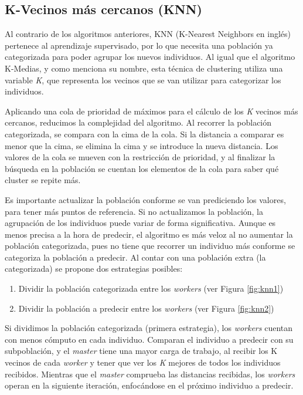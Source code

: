 		
		
		
	\subsection{K-Vecinos más cercanos (KNN)}
	\label{cap:3_2_3}
		Al contrario de los algoritmos anteriores, KNN (K-Nearest Neighbors en inglés) pertenece al aprendizaje supervisado, por lo que necesita una población ya categorizada para poder agrupar los nuevos individuos. Al igual que el algoritmo K-Medias, y como menciona su nombre, esta técnica de clustering utiliza una variable \textit{K}, que representa los vecinos que se van utilizar para categorizar los individuos.
		
		Aplicando una cola de prioridad de máximos para el cálculo de los \textit{K} vecinos más cercanos, reducimos la complejidad del algoritmo. Al recorrer la población categorizada, se compara con la cima de la cola. Si la distancia a comparar es menor que la cima, se elimina la cima y se introduce la nueva distancia. Los valores de la cola se mueven con la restricción de prioridad, y al finalizar la búsqueda en la población se cuentan los elementos de la cola para saber qué cluster se repite más.
		
		Es importante actualizar la población conforme se van prediciendo los valores, para tener más puntos de referencia. Si no actualizamos la población, la agrupación de los individuos puede variar de forma significativa. Aunque es menos precisa a la hora de predecir, el algoritmo es más veloz al no aumentar la población categorizada, pues no tiene que recorrer un individuo más conforme se categoriza la población a predecir. Al contar con una población extra (la categorizada) se propone dos estrategias posibles:
		
		
		\begin{enumerate}
			\item Dividir la población categorizada entre los \textit{workers} (ver Figura \ref{fig:knn1})
			\item Dividir la población a predecir entre los \textit{workers} (ver Figura \ref{fig:knn2})
		\end{enumerate}
		
		Si dividimos la población categorizada (primera estrategia), los \textit{workers} cuentan con menos cómputo en cada individuo. Comparan el individuo a predecir con su subpoblación, y el \textit{master} tiene una mayor carga de trabajo, al recibir los K vecinos de cada \textit{worker} y tener que ver los \textit{K} mejores de todos los individuos recibidos.  Mientras que el \textit{master} comprueba las distancias recibidas, los \textit{workers} operan en la siguiente iteración, enfocándose en el próximo individuo a predecir. 
		

